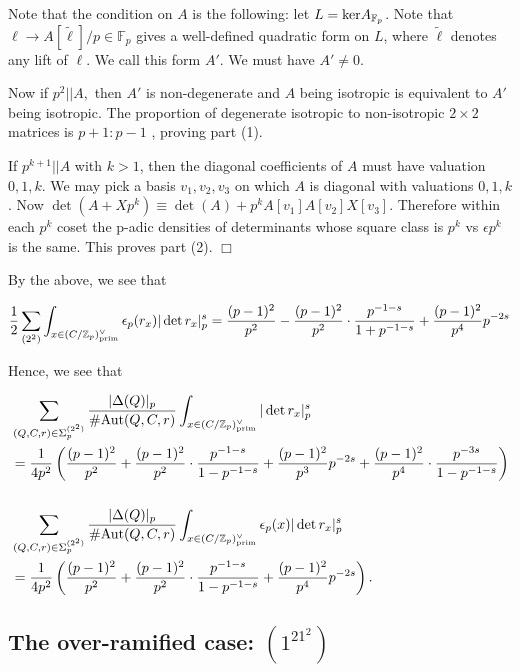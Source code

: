 \documentclass{article}
\def\Z{{\mathbb Z}}
\def\ra{{\rightarrow}}
\def\Aut{{\rm Aut}}
\def\prim{{\rm prim}}
\def\ker{{\rm ker}}
\def\F{{\mathbb F}}
\def\Z{{\mathbb Z}}
\def\F{{\mathbb F}}
\newenvironment{proof}{\noindent {\bf Proof:}}{$\Box$ \vspace{2 ex}}
\begin{document}
\begin{proof}
Note that the condition on $A$ is the following: let $L=\ker A_{\F_p}$. Note that $\ell\ra A[\tilde{\ell}]/p\in \F_p$ gives a well-defined quadratic form on $L$, where $\tilde{\ell}$ denotes any lift of $\ell$. We call this form $A'$. We must have $A'\neq 0$. 

Now if $p^2|| A,$ then $A'$ is non-degenerate and $A$ being isotropic is equivalent to $A'$ being isotropic. The proportion of degenerate isotropic to non-isotropic $2\times 2$ matrices is $p+1:p-1$ , proving part (1).


If $p^{k+1}|| A$ with $k>1$, then the diagonal coefficients of $A$ must have valuation $0,1,k$. We may pick a basis $v_1,v_2,v_3$ on which $A$ is diagonal with valuations $0,1,k$. Now $\det(A+Xp^k) \equiv \det(A)+p^{k}A[v_1]A[v_2] X[v_3]$. Therefore within each $p^k$ coset the p-adic densities of determinants whose square class is $p^k$ vs $\epsilon p^k$ is the same. This proves part (2). 
\end{proof}

By the above, we see that

$$\frac12\sum_{(2^2)}\int_{x\in (C/\Z_p)^{\vee}_{\prim}}  \epsilon_p(r_x)|\det{r_x}|_p^{s} = \frac{(p-1)^2}{p^2} - \frac{(p-1)^2}{p^2}\cdot \frac{p^{-1-s}}{1+p^{-1-s}} + \frac{(p-1)^2}{p^4}p^{-2s}$$




Hence, we see that



\begin{align*}
&\displaystyle\sum_{(Q,C,r)\in\Sigma_p^{(2^2)}}\frac{|\Delta(Q)|_p}{\#\Aut(Q,C,r)}\int_{x\in (C/\Z_p)^{\vee}_{\prim}}  |\det{r_x}|_p^{s}\\&=\frac{1}{4p^2}\left(\frac{(p-1)^2}{p^2} + \frac{(p-1)^2}{p^2}\cdot \frac{p^{-1-s}}{1-p^{-1-s}} + \frac{(p-1)^2}{p^3}p^{-2s}+ \frac{(p-1)^2}{p^4}\cdot\frac{p^{-3s}}{1-p^{-1-s}}\right)\\
&\\ &\displaystyle\sum_{(Q,C,r)\in\Sigma_p^{(2^2)}}\frac{|\Delta(Q)|_p}{\#\Aut(Q,C,r)}\int_{x\in (C/\Z_p)^{\vee}_{\prim}}  \epsilon_p(x)|\det{r_x}|_p^{s}\\ &= \frac{1}{4p^2}\left(\frac{(p-1)^2}{p^2} + \frac{(p-1)^2}{p^2}\cdot \frac{p^{-1-s}}{1-p^{-1-s}} + \frac{(p-1)^2}{p^4}p^{-2s}\right).
\end{align*}



\subsection{The over-ramified case: $(1^21^2)$}
\end{document}
